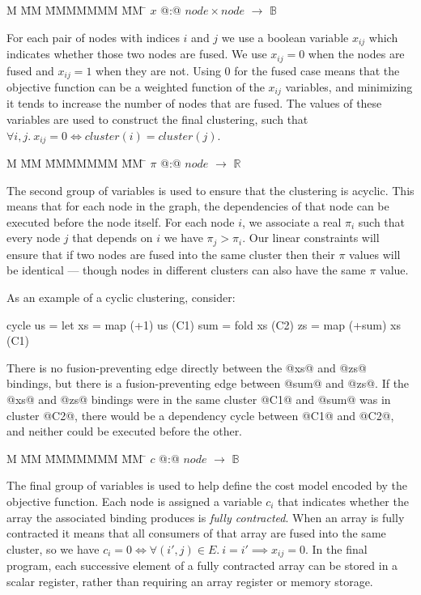 \begin{tabbing}
M   \= MM \= MMMMMMM \= MM \= \kill
$x$   \> @:@  \> $node \times node$ \> $\to$ \> $\mathbb{B}$
\end{tabbing}
For each pair of nodes with indices $i$ and $j$ we use a boolean variable $x_{ij}$ which indicates whether those two nodes are fused. We use $x_{ij} = 0$ when the nodes are fused and $x_{ij} = 1$ when they are not. Using $0$ for the fused case means that the objective function can be a weighted function of the $x_{ij}$ variables, and minimizing it tends to increase the number of nodes that are fused. The values of these variables are used to construct the final clustering, such that $\forall i,j.\ x_{ij} = 0 \iff cluster(i) = cluster(j)$.


\begin{tabbing}
M   \= MM \= MMMMMMM \= MM \= \kill
$\pi$ \> @:@  \> $node$             \> $\to$ \> $\mathbb{R}$
\end{tabbing}
The second group of variables is used to ensure that the clustering is acyclic. This means that for each node in the graph, the dependencies of that node can be executed before the node itself. For each node $i$, we associate a real $\pi_i$ such that every node $j$ that depends on $i$ we have $\pi_j > \pi_i$. Our linear constraints will ensure that if two nodes are fused into the same cluster then their $\pi$ values will be identical --- though nodes in different clusters can also have the same $\pi$ value.

As an example of a cyclic clustering, consider:
\begin{code}
  cycle us
   = let xs  = map (+1) us          (C1)
         sum = fold xs              (C2)
         zs  = map (+sum) xs        (C1)
\end{code}
There is no fusion-preventing edge directly between the @xs@ and @zs@ bindings, but there is a fusion-preventing edge between @sum@ and @zs@. If the @xs@ and @zs@ bindings were in the same cluster @C1@ and @sum@ was in cluster @C2@, there would be a dependency cycle between @C1@ and @C2@, and neither could be executed before the other.

\begin{tabbing}
M   \= MM \= MMMMMMM \= MM \= \kill
$c$   \> @:@  \> $node$             \> $\to$ \> $\mathbb{B}$
\end{tabbing}
The final group of variables is used to help define the cost model encoded by the objective function. Each node is assigned a variable $c_i$ that indicates whether the array the associated binding produces is \emph{fully contracted}. When an array is fully contracted it means that all consumers of that array are fused into the same cluster, so we have $c_i = 0 \iff \forall (i',j) \in E.\ i = i' \implies x_{ij} = 0$. In the final program, each successive element of a fully contracted array can be stored in a scalar register, rather than requiring an array register or memory storage. 


